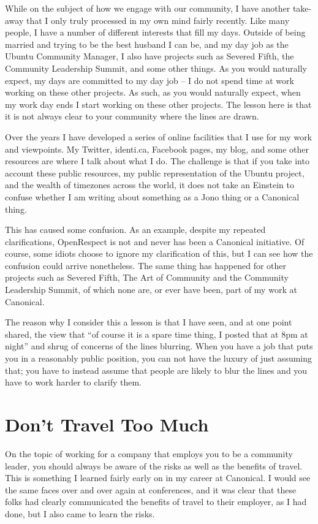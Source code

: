 While on the subject of how we engage with our community, I have another
take-away that I only truly processed in my own mind fairly recently. Like many
people, I have a number of different interests that fill my days. Outside of
being married and trying to be the best husband I can be, and my day job as the
Ubuntu Community Manager, I also have projects such as Severed Fifth, the
Community Leadership Summit, and some other things. As you would naturally
expect, my days are committed to my day job -- I do not spend time at work
working on these other projects. As such, as you would naturally expect, when my
work day ends I start working on these other projects. The lesson here is that
it is not always clear to your community where the lines are drawn.

Over the years I have developed a series of online facilities that I use for my
work and viewpoints. My Twitter, identi.ca, Facebook pages, my blog, and some
other resources are where I talk about what I do. The challenge is that if you
take into account these public resources, my public representation of the Ubuntu
project, and the wealth of timezones across the world, it does not take an
Einstein to confuse whether I am writing about something as a Jono thing or a
Canonical thing.

This has caused some confusion. As an example, despite my repeated
clarifications, OpenRespect is not and never has been a Canonical initiative. Of
course, some idiots choose to ignore my clarification of this, but I can see how
the confusion could arrive nonetheless. The same thing has happened for other
projects such as Severed Fifth, The Art of Community and the Community
Leadership Summit, of which none are, or ever have been, part of my work at
Canonical.

The reason why I consider this a lesson is that I have seen, and at one point
shared, the view that ``of course it is a spare time thing, I posted that at 8pm
at night'' and shrug of concerns of the lines blurring. When you have a job that
puts you in a reasonably public position, you can not have the luxury of just
assuming that; you have to instead assume that people are likely to blur the
lines and you have to work harder to clarify them.

\section*{Don’t Travel Too Much}

On the topic of working for a company that employs you to be a community leader,
you should always be aware of the risks as well as the benefits of travel. This
is something I learned fairly early on in my career at Canonical. I would see
the same faces over and over again at conferences, and it was clear that these
folks had clearly communicated the benefits of travel to their employer, as I
had done, but I also came to learn the risks.

